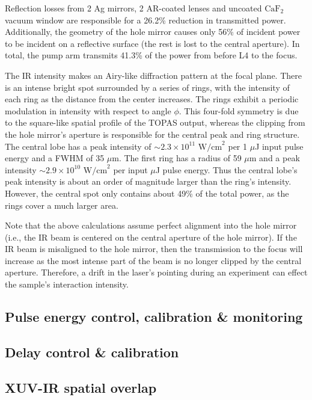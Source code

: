 Reflection losses from 2 Ag mirrors, 2 AR-coated lenses and uncoated $\text{CaF}_2$ vacuum window are responsible for a 26.2\% reduction in transmitted power. Additionally, the geometry of the hole mirror causes only 56\% of incident power to be incident on a reflective surface (the rest is lost to the central aperture). In total, the pump arm transmits 41.3\% of the power from before L4 to the focus.

The IR intensity makes an Airy-like diffraction pattern at the focal plane. There is an intense bright spot surrounded by a series of rings, with the intensity of each ring as the distance from the center increases. The rings exhibit a periodic modulation in intensity with respect to angle $\phi$. This four-fold symmetry is due to the square-like spatial profile of the TOPAS output, whereas the clipping from the hole mirror's aperture is responsible for the central peak and ring structure. The central lobe has a peak intensity of $\sim 2.3 \times 10^{11} \text{ W/cm}^2$ per 1 $\mu$J input pulse energy and a FWHM of 35 $\mu$m. The first ring has a radius of 59 $\mu$m and a peak intensity $\sim 2.9 \times 10^{10} \text{ W/cm}^2$ per input $\mu$J pulse energy. Thus the central lobe's peak intensity is about an order of magnitude larger than the ring's intensity. However, the central spot only contains about 49\% of the total power, as the rings cover a much larger area.

Note that the above calculations assume perfect alignment into the hole mirror (i.e., the IR beam is centered on the central aperture of the hole mirror). If the IR beam is misaligned to the hole mirror, then the transmission to the focus will increase as the most intense part of the beam is no longer clipped by the central aperture. Therefore, a drift in the laser's pointing during an experiment can effect the sample's interaction intensity.


\subsection{Pulse energy control, calibration \& monitoring}

\subsection{Delay control \& calibration}

\subsection{XUV-IR spatial overlap}

